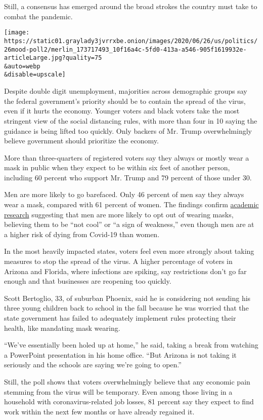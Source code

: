 Still, a consensus has emerged around the broad strokes the country must
take to combat the pandemic.

\texttt{[image: https://static01.graylady3jvrrxbe.onion/images/2020/06/26/us/politics/26mood-poll2/merlin\_173717493\_10f16a4c-5fd0-413a-a546-905f1619932e-articleLarge.jpg?quality=75\\\&auto=webp\\\&disable=upscale]}

Despite double digit unemployment, majorities across demographic groups
say the federal government's priority should be to contain the spread of
the virus, even if it hurts the economy. Younger voters and black voters
take the most stringent view of the social distancing rules, with more
than four in 10 saying the guidance is being lifted too quickly. Only
backers of Mr. Trump overwhelmingly believe government should prioritize
the economy.

More than three-quarters of registered voters say they always or mostly
wear a mask in public when they expect to be within six feet of another
person, including 60 percent who support Mr. Trump and 79 percent of
those under 30.

Men are more likely to go barefaced. Only 46 percent of men say they
always wear a mask, compared with 61 percent of women. The findings
confirm \href{https://psyarxiv.com/tg7vz}{academic research} suggesting
that men are more likely to opt out of wearing masks, believing them to
be ``not cool'' or ``a sign of weakness,'' even though men are at a
higher risk of dying from Covid-19 than women.

In the most heavily impacted states, voters feel even more strongly
about taking measures to stop the spread of the virus. A higher
percentage of voters in Arizona and Florida, where infections are
spiking, say restrictions don't go far enough and that businesses are
reopening too quickly.

Scott Bertoglio, 33, of suburban Phoenix, said he is considering not
sending his three young children back to school in the fall because he
was worried that the state government has failed to adequately implement
rules protecting their health, like mandating mask wearing.

``We've essentially been holed up at home,'' he said, taking a break
from watching a PowerPoint presentation in his home office. ``But
Arizona is not taking it seriously and the schools are saying we're
going to open.''

Still, the poll shows that voters overwhelmingly believe that any
economic pain stemming from the virus will be temporary. Even among
those living in a household with coronavirus-related job losses, 81
percent say they expect to find work within the next few months or have
already regained it.

